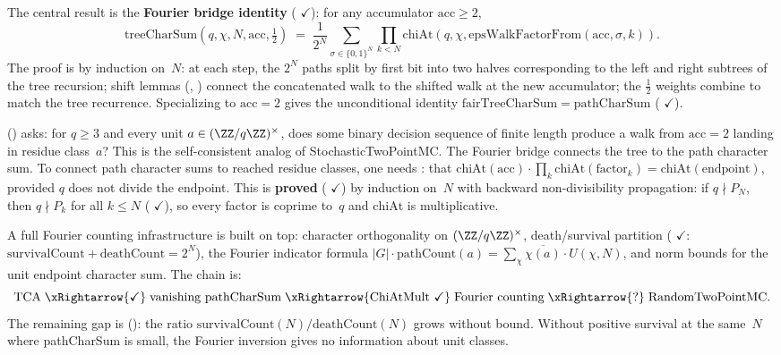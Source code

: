 The central result is the \textbf{Fourier bridge identity}
(
{\color{leanink}$\checkmark$}): for any accumulator $\mathrm{acc} \geq 2$,
\[
  \mathrm{treeCharSum}(q, \chi, N, \mathrm{acc}, \tfrac{1}{2})
  \;=\;
  \frac{1}{2^N}
  \sum_{\sigma \in \{0,1\}^N}
  \prod_{k < N} \mathrm{chiAt}(q, \chi,
    \mathrm{epsWalkFactorFrom}(\mathrm{acc}, \sigma, k)).
\]
The proof is by induction on~$N$: at each step, the $2^N$ paths split
by first bit into two halves corresponding to the left and right
subtrees of the tree recursion; shift lemmas
(, )
connect the concatenated walk to the shifted walk at the new
accumulator; the $\tfrac{1}{2}$ weights combine to match the tree
recurrence.  Specializing to $\mathrm{acc} = 2$ gives the
unconditional identity
$\mathrm{fairTreeCharSum} = \mathrm{pathCharSum}$
(
{\color{leanink}$\checkmark$}).

()
asks: for $q \geq 3$ and every unit $a \in (\ZZ/q\ZZ)^\times$, does
some binary decision sequence of finite length produce a walk from
$\mathrm{acc} = 2$ landing in residue class~$a$?  This is the
self-consistent analog of StochasticTwoPointMC.
The Fourier bridge connects the tree to the path character sum.
To connect path character sums to reached residue classes, one needs
: that $\mathrm{chiAt}(\mathrm{acc})
\cdot \prod_k \mathrm{chiAt}(\text{factor}_k)
= \mathrm{chiAt}(\text{endpoint})$, provided $q$ does not divide the
endpoint.  This is \textbf{proved}
(
{\color{leanink}$\checkmark$})
by induction on~$N$ with backward non-divisibility propagation:
if $q \nmid P_N$, then $q \nmid P_k$ for all $k \leq N$
(
{\color{leanink}$\checkmark$}),
so every factor is coprime to~$q$ and $\mathrm{chiAt}$ is
multiplicative.

A full Fourier counting infrastructure is built on top: character
orthogonality on $(\ZZ/q\ZZ)^\times$, death/survival partition
(
{\color{leanink}$\checkmark$}:
$\mathrm{survivalCount} + \mathrm{deathCount} = 2^N$),
the Fourier indicator formula
$|G| \cdot \mathrm{pathCount}(a)
= \sum_\chi \overline{\chi(a)} \cdot U(\chi, N)$,
and norm bounds for the unit endpoint character sum.
The chain is:
\[
  \mathrm{TCA}
  \;\xRightarrow{\checkmark}\;
  \text{vanishing pathCharSum}
  \;\xRightarrow{\text{ChiAtMult}\ \checkmark}\;
  \text{Fourier counting}
  \;\xRightarrow{?}\;
  \text{RandomTwoPointMC}.
\]
The remaining gap is 
():
the ratio $\mathrm{survivalCount}(N) / \mathrm{deathCount}(N)$
grows without bound.  Without positive survival at the same~$N$
where pathCharSum is small, the Fourier inversion gives no
information about unit classes.

